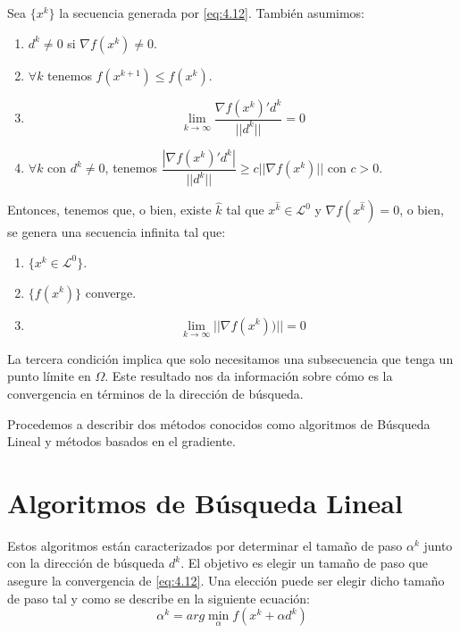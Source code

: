 \begin{proposicion}
Sea $\{x^k\}$ la secuencia generada por \ref{eq:4.12}. 
También asumimos:
\begin{enumerate}
	\item $d^k \neq 0$ si $\nabla f(x^k)\neq 0$.
	\item $\forall k$ tenemos $f(x^{k+1}) \leq f(x^k)$.
	\item \begin{equation}
	\lim_{k\xrightarrow{}{}\infty}\dfrac{\nabla f(x^k)'d^k}{||d^k||} = 0
	\label{eq:4.13}
	\end{equation}
	\item $\forall k$ con $d^k\neq 0$, tenemos $\dfrac{|\nabla f(x^k)'d^k|}{||d^k||} \geq c||\nabla f(x^k)||$ con $c>0$.
\end{enumerate}
Entonces, tenemos que, o bien, existe $\hat{k}$ tal que $x^{\hat{k}}\in\mathcal{L}^0$ y $\nabla f(x^{\hat{k}}) = 0$, o bien, se genera una secuencia infinita tal que:
\begin{enumerate}
	\item $\{x^k\in\mathcal{L}^0\}$.
	\item $\{f(x^k)\}$ converge.
	\item \begin{equation}
	\lim_{k\xrightarrow{}{}\infty} ||\nabla f(x^k))|| = 0
	\label{eq:4.14}
	\end{equation}
\end{enumerate}
\end{proposicion}

La tercera condición implica que solo necesitamos una subsecuencia que tenga un punto límite en $\Omega$. 
Este resultado nos da información sobre cómo es la convergencia en términos de la dirección de búsqueda.

Procedemos a describir dos métodos conocidos como algoritmos de Búsqueda Lineal y métodos basados en el gradiente.

\section{Algoritmos de Búsqueda Lineal}

Estos algoritmos están caracterizados por determinar el tamaño de paso $\alpha^k$ junto con la dirección de búsqueda $d^k$. 
El objetivo es elegir un tamaño de paso que asegure la convergencia de \ref{eq:4.12}. 
Una elección puede ser elegir dicho tamaño de paso tal y como se describe en la siguiente ecuación:
\begin{equation*}
\alpha^k = arg \min_\alpha f(x^k+\alpha d^k)
\end{equation*}

